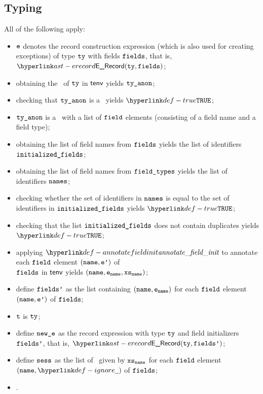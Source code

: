 \subsection{Typing}
\ProseParagraph
All of the following apply:
\begin{itemize}
  \item $\texttt{e}$ denotes the record construction expression (which is also used for creating exceptions) of type $\texttt{ty}$ with fields $\texttt{fields}$,
        that is, $\ERecord(\tty, \vfields)$;
  \item obtaining the \underlyingtype\ of $\texttt{ty}$ in $\textsf{tenv}$ yields $\texttt{ty\_anon}$\ProseOrTypeError;
  \item checking that $\texttt{ty\_anon}$ is a \structuredtype\ yields $\True$\ProseOrTypeError;%
  \item $\texttt{ty\_anon}$ is a \structuredtype\ with a list of $\texttt{field}$ elements (consisting of a field name and a field type);
  \item obtaining the list of field names from $\texttt{fields}$ yields the list of identifiers \\
        $\texttt{initialized\_fields}$;
  \item obtaining the list of field names from $\texttt{field\_types}$ yields the list of identifiers $\texttt{names}$;
  \item checking whether the set of identifiers in $\texttt{names}$ is equal to the set of identifiers in $\texttt{initialized\_fields}$
        yields $\True$\ProseOrTypeError;
  \item checking that the list $\texttt{initialized\_fields}$ does not contain duplicates yields \\
        $\True$\ProseOrTypeError;
  \item applying $\annotatefieldinit$ to annotate each $\texttt{field}$ element $(\texttt{name},\texttt{e'})$ of \\
        $\texttt{fields}$ in $\textsf{tenv}$ yields $(\texttt{name},\texttt{e}_{\texttt{name}},\texttt{xs}_{\texttt{name}})$\ProseOrTypeError;
  \item define $\texttt{fields'}$ as the list containing $(\texttt{name},\texttt{e}_{\texttt{name}})$ for each $\texttt{field}$ element $(\texttt{name},\texttt{e'})$ of $\texttt{fields}$;
  \item $\texttt{t}$ is $\texttt{ty}$;
  \item define $\texttt{new\_e}$ as the record expression with type $\texttt{ty}$ and field initializers $\texttt{fields'}$, that is, $\ERecord(\tty, \fieldsp)$;
  \item define $\vsess$ as the list of \sideeffectdescriptorsetsterm\ given by $\texttt{xs}_{\texttt{name}}$ for each $\texttt{field}$ element $(\name,\Ignore)$ of $\texttt{fields}$;
  \item \Prosenonconflictingunion{$\vsess$}{$\vses$}.
\end{itemize}
